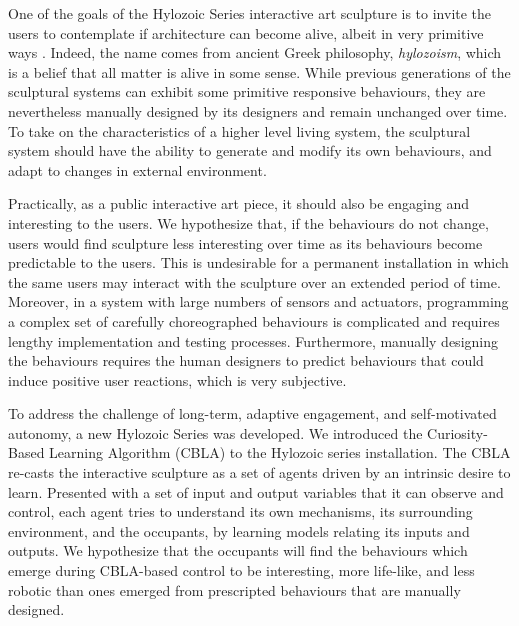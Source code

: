 One of the goals of the Hylozoic Series interactive art sculpture is to invite the users to contemplate if architecture can become alive, albeit in very primitive ways \cite{Beesley2012}. Indeed, the name comes from ancient Greek philosophy, \textit{hylozoism}, which is a belief that all matter is alive in some sense. While previous generations of the sculptural systems can exhibit some primitive responsive behaviours, they are nevertheless manually designed by its designers and remain unchanged over time. To take on the characteristics of a higher level living system, the sculptural system should have the ability to generate and modify its own behaviours, and adapt to changes in external environment.

Practically, as a public interactive art piece, it should also be engaging and interesting to the users. We hypothesize that, if the behaviours do not change, users would find sculpture less interesting over time as its behaviours become predictable to the users. This is undesirable for a permanent installation in which the same users may interact with the sculpture over an extended period of time. 
Moreover, in a system with large numbers of sensors and actuators, programming a complex set of carefully choreographed behaviours is complicated and requires lengthy implementation and testing processes. Furthermore, manually designing the behaviours requires the human designers to predict behaviours that could induce positive user reactions, which is very subjective. 

To address the challenge of long-term, adaptive engagement, and self-motivated autonomy, a new Hylozoic Series was developed. We introduced the Curiosity-Based Learning Algorithm (CBLA) to the Hylozoic series installation. The CBLA re-casts the interactive sculpture as a set of agents driven by an intrinsic desire to learn. Presented with a set of input and output variables that it can observe and control, each agent tries to understand its own mechanisms, its surrounding environment, and the occupants, by learning models relating its inputs and outputs. We hypothesize that the occupants will find the behaviours which emerge during CBLA-based control to be interesting, more life-like, and less robotic than ones emerged from prescripted behaviours that are manually designed. 


